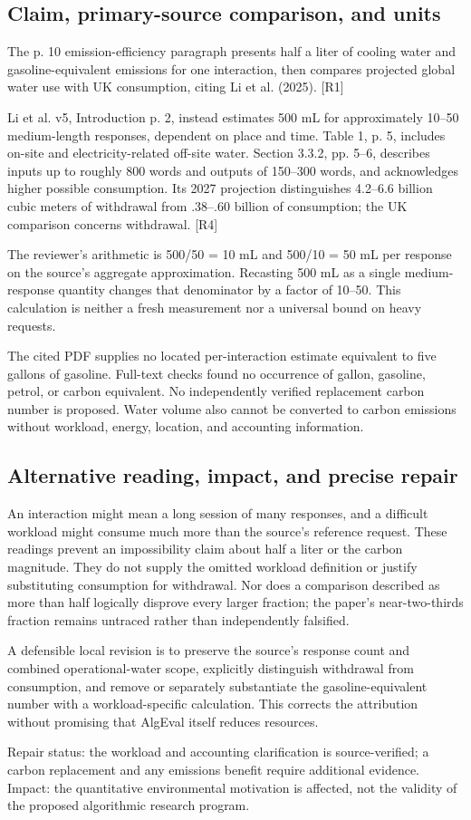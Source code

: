 \documentclass[10pt]{article}
\begin{document}
\subsection*{Claim, primary-source comparison, and units}
The p. 10 emission-efficiency paragraph presents half a liter of cooling water and gasoline-equivalent emissions for one interaction, then compares projected global water use with UK consumption, citing Li et al. (2025). [R1]\par
Li et al. v5, Introduction p. 2, instead estimates 500 mL for approximately 10–50 medium-length responses, dependent on place and time. Table 1, p. 5, includes on-site and electricity-related off-site water. Section 3.3.2, pp. 5–6, describes inputs up to roughly 800 words and outputs of 150–300 words, and acknowledges higher possible consumption. Its 2027 projection distinguishes 4.2–6.6 billion cubic meters of withdrawal from .38–.60 billion of consumption; the UK comparison concerns withdrawal. [R4]\par
The reviewer’s arithmetic is 500/50 = 10 mL and 500/10 = 50 mL per response on the source’s aggregate approximation. Recasting 500 mL as a single medium-response quantity changes that denominator by a factor of 10–50. This calculation is neither a fresh measurement nor a universal bound on heavy requests.\par
The cited PDF supplies no located per-interaction estimate equivalent to five gallons of gasoline. Full-text checks found no occurrence of gallon, gasoline, petrol, or carbon equivalent. No independently verified replacement carbon number is proposed. Water volume also cannot be converted to carbon emissions without workload, energy, location, and accounting information.\par
\subsection*{Alternative reading, impact, and precise repair}
An interaction might mean a long session of many responses, and a difficult workload might consume much more than the source’s reference request. These readings prevent an impossibility claim about half a liter or the carbon magnitude. They do not supply the omitted workload definition or justify substituting consumption for withdrawal. Nor does a comparison described as more than half logically disprove every larger fraction; the paper’s near-two-thirds fraction remains untraced rather than independently falsified.\par
A defensible local revision is to preserve the source’s response count and combined operational-water scope, explicitly distinguish withdrawal from consumption, and remove or separately substantiate the gasoline-equivalent number with a workload-specific calculation. This corrects the attribution without promising that AlgEval itself reduces resources.\par
Repair status: the workload and accounting clarification is source-verified; a carbon replacement and any emissions benefit require additional evidence. Impact: the quantitative environmental motivation is affected, not the validity of the proposed algorithmic research program.\par
\end{document}
